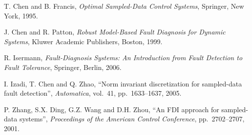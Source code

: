\documentclass[A4paper,conference]{IEEEtran}
\begin{document}
\begin{thebibliography}{99}

T. Chen and B. Francis, {\em Optimal Sampled-Data Control Systems},
Springer, New York, 1995.

J. Chen and R. Patton, \emph{Robust Model-Based Fault Diagnosis for
Dynamic Systems}, Kluwer Academic Publishers, Boston, 1999.

R. Isermann, \emph{Fault-Diagnosis Systems: An Introduction from
Fault Detection to Fault Tolerance}, Springer, Berlin, 2006.

I. Izadi, T. Chen and Q. Zhao, ``Norm invariant discretization for
sampled-data fault detection'', \emph{Automatica}, vol.~41,
pp.~1633--1637, 2005.

P. Zhang, S.X. Ding, G.Z. Wang and D.H. Zhou, ``An FDI approach for
sampled-data systems'', \emph{Proceedings of the American Control
Conference}, pp.~2702--2707, 2001.

\end{thebibliography}
\end{document}
